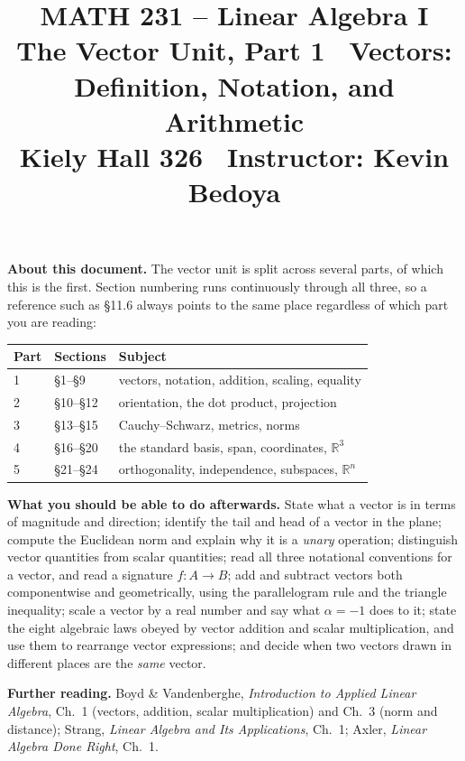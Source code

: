 \documentclass[11pt]{article}
\title{\vspace{-1.2cm}\textbf{\sffamily MATH 231 -- Linear Algebra I}\\[4pt]
       {\large\sffamily The Vector Unit, Part 1 \textbullet\ Vectors:
        Definition, Notation, and Arithmetic}\\[2pt]
       {\normalsize\sffamily Kiely Hall 326 \textbullet\
        Instructor: Kevin Bedoya}}
\author{}
\date{}
\theoremstyle{definition}
\theoremstyle{remark}
\newcommand{\R}{\mathbb{R}}
\begin{document}
\maketitle
\vspace{-1.6cm}

\noindent\textbf{About this document.} The vector unit is split across several
parts, of which this is the first. Section numbering runs continuously through
all three, so a reference such as \S11.6 always points to the same place
regardless of which part you are reading:

\begin{center}
\renewcommand{\arraystretch}{1.2}
\begin{tabular}{@{}l l l@{}}
\toprule
\textbf{Part} & \textbf{Sections} & \textbf{Subject} \\
\midrule
1 & \S1--\S9   & vectors, notation, addition, scaling, equality \\
2 & \S10--\S12 & orientation, the dot product, projection \\
3 & \S13--\S15 & Cauchy--Schwarz, metrics, norms \\
4 & \S16--\S20  & the standard basis, span, coordinates, $\R^{3}$ \\
5 & \S21--\S24  & orthogonality, independence, subspaces, $\R^{n}$ \\
\bottomrule
\end{tabular}
\end{center}

\noindent\textbf{What you should be able to do afterwards.} State what a vector
is in terms of magnitude and direction; identify the tail and head of a vector
in the plane; compute the Euclidean norm and explain why it is a \emph{unary}
operation; distinguish vector quantities from scalar quantities; read all three
notational conventions for a vector, and read a signature $f:A\to B$; add and
subtract vectors both componentwise and geometrically, using the parallelogram
rule and the triangle inequality; scale a vector by a real number and say what
$\alpha=-1$ does to it; state the eight algebraic laws obeyed by vector addition
and scalar multiplication, and use them to rearrange vector expressions; and
decide when two vectors drawn in different places are the \emph{same} vector.

\medskip
\noindent\textbf{Further reading.}
Boyd \& Vandenberghe, \emph{Introduction to Applied Linear Algebra}, Ch.~1
(vectors, addition, scalar multiplication) and Ch.~3 (norm and distance);
Strang, \emph{Linear Algebra and Its Applications}, Ch.~1;
Axler, \emph{Linear Algebra Done Right}, Ch.~1.
\end{document}

